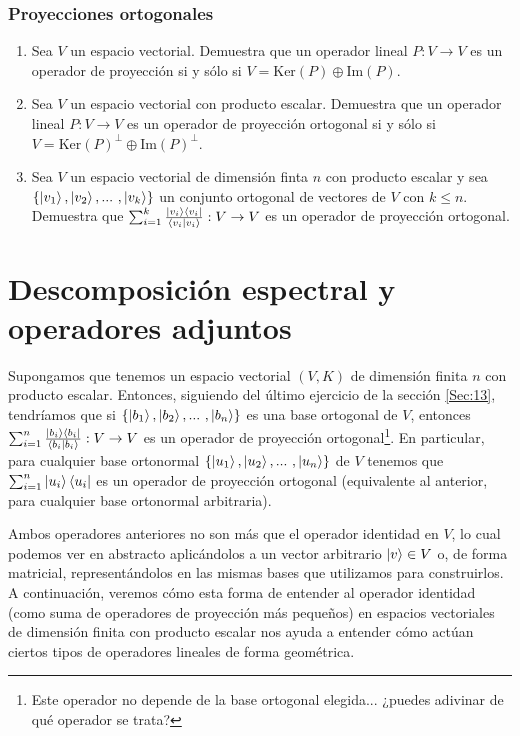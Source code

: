 \documentclass[12pt,dvipsnames]{article}
\begin{document}
\subsubsection{Proyecciones ortogonales} \label{Ejer:Proyecciones_ortogonales}
\begin{enumerate}
    \item Sea $V$ un espacio vectorial. Demuestra que un operador lineal $P:V\to V$ es un operador de proyección si y sólo si $V=\text{Ker}(P)\oplus\text{Im}(P)$.
    \item Sea $V$ un espacio vectorial con producto escalar. Demuestra que un operador lineal $P:V\to V$ es un operador de proyección ortogonal si y sólo si $V=\text{Ker}(P)^\perp\oplus\text{Im}(P)^\perp$.
    \item Sea $V$ un espacio vectorial de dimensión finta $n$ con producto escalar y sea $\{\ket{v_1},\ket{v_2},... \ ,\ket{v_k}\}$ un conjunto ortogonal de vectores de $V$ con $k\le n$. Demuestra que $\sum_{i=1}^k\frac{\ket{v_i}\bra{v_i}}{\braket{v_i|v_i}}:V\to V$ es un operador de proyección ortogonal.
\end{enumerate}

\newpage
\section{Descomposición espectral y operadores adjuntos} \label{Sec:14} 


Supongamos que tenemos un espacio vectorial $(V,K)$ de dimensión finita $n$ con producto escalar. Entonces, siguiendo del último ejercicio de la sección \ref{Sec:13}, tendríamos que si $\{\ket{b_1},\ket{b_2},... \ ,\ket{b_n}\}$ es una base ortogonal de $V$, entonces $\sum_{i=1}^n \frac{\ket{b_i}\bra{b_i}}{\braket{b_i|b_i}}:V\to V$ es un operador de proyección ortogonal\footnote{Este operador no depende de la base ortogonal elegida... ¿puedes adivinar de qué operador se trata?}. En particular, para cualquier base ortonormal $\{\ket{u_1},\ket{u_2},... \ ,\ket{u_n}\}$ de $V$ tenemos que $\sum_{i=1}^n\ket{u_i}\bra{u_i}$ es un operador de proyección ortogonal (equivalente al anterior, para cualquier base ortonormal arbitraria).

\vspace{3mm}
Ambos operadores anteriores no son más que el operador identidad en $V$, lo cual podemos ver en abstracto aplicándolos a un vector arbitrario $\ket{v}\in V$ o, de forma matricial, representándolos en las mismas bases que utilizamos para construirlos. A continuación, veremos cómo esta forma de entender al operador identidad (como suma de operadores de proyección más pequeños) en espacios vectoriales de dimensión finita con producto escalar nos ayuda a entender cómo actúan ciertos tipos de operadores lineales de forma geométrica. 
\end{document}
